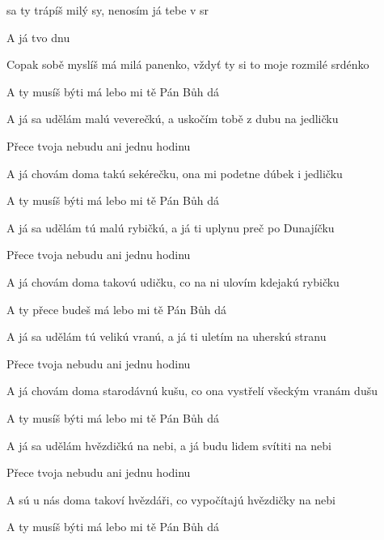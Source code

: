 

\zs
{} sa ty trápíš  milý sy, nenosím já tebe  v sr

A já tvo  dnu 
\ks

\zs
Copak sobě myslíš má milá panenko, vždyť ty si to moje rozmilé srdénko

A ty musíš býti má lebo mi tě Pán Bůh dá
\ks

\zs
A já sa udělám malú veverečkú, a uskočím tobě z dubu na jedličku

Přece tvoja nebudu ani jednu hodinu
\ks

\zs
A já chovám doma takú sekérečku, ona mi podetne dúbek i jedličku

A ty musíš býti má lebo mi tě Pán Bůh dá
\ks

\zs
A já sa udělám tú malú rybičkú,
a já ti uplynu preč po Dunajíčku

Přece tvoja nebudu ani jednu hodinu
\ks

\zs
A já chovám doma takovú udičku,
co na ni ulovím kdejakú rybičku

A ty přece budeš má lebo mi tě Pán Bůh dá
\ks

\zr
{}     
\kr

\zs
A já sa udělám tú velikú vranú,
a já ti uletím na uherskú stranu

Přece tvoja nebudu ani jednu hodinu
\ks

\zs
A já chovám doma starodávnú kušu,
co ona vystřelí všeckým vranám dušu

A ty musíš býti má lebo mi tě Pán Bůh dá
\ks

\zs
A já sa udělám hvězdičkú na nebi,
a já budu lidem svítiti na nebi

Přece tvoja nebudu ani jednu hodinu
\ks

\zs
A sú u nás doma takoví hvězdáři,
co vypočítajú hvězdičky na nebi

A ty musíš býti má lebo mi tě Pán Bůh dá
\ks

\zr
{}      ~~
     
\kr

\kp







